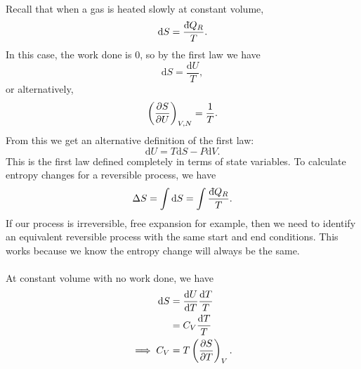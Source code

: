\documentclass[../thermodynamics.tex]{subfiles}
\begin{document}
        \paragraph{}
        Recall that when a gas is heated slowly at constant volume,
        \begin{equation}
            \mathrm{d}S=\frac{\dbar{Q}_R}{T}.
        \end{equation}
        In this case, the work done is 0, so by the first law we have
        \begin{equation}
            \mathrm{d}S=\frac{\mathrm{d}U}{T},
        \end{equation}
        or alternatively,
        \begin{equation}
            \left(\pdv{S}{U}\right)_{V,N}=\frac{1}{T}.
        \end{equation}
        From this we get an alternative definition of the first law:
        \begin{equation}
            \mathrm{d}{U}=T\mathrm{d}S-P\mathrm{d}V.
        \end{equation}
        This is the first law defined completely in terms of state variables.
        To calculate entropy changes for a reversible process, we have
        \begin{equation}
            \Delta S=\int\mathrm{d}S=\int\frac{\dbar{Q}_R}{T}.
        \end{equation}
        If our process is irreversible, free expansion for example, then we need to identify an equivalent reversible process with the same start and end conditions.
        This works because we know the entropy change will always be the same.

        \paragraph{}
        At constant volume with no work done, we have
        \begin{align}
            \mathrm{d}S&=\dv{U}{T}\frac{\mathrm{d}T}{T}\\
            &=C_V\frac{\mathrm{d}T}{T}\\
            \implies C_V&=T\left(\pdv{S}{T}\right)_V.
        \end{align}
\end{document}
